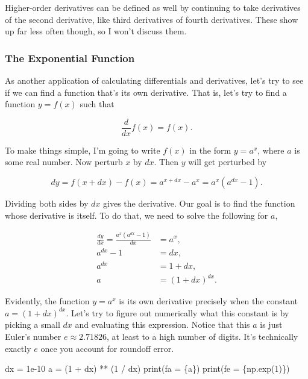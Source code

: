 \documentclass[
  letterpaper,
  DIV=11,
  numbers=noendperiod]{scrreprt}
\newenvironment{Shaded}{\begin{snugshade}}{\end{snugshade}}
\newcommand{\BuiltInTok}[1]{\textcolor[rgb]{0.00,0.23,0.31}{#1}}
\newcommand{\DecValTok}[1]{\textcolor[rgb]{0.68,0.00,0.00}{#1}}
\newcommand{\FloatTok}[1]{\textcolor[rgb]{0.68,0.00,0.00}{#1}}
\newcommand{\NormalTok}[1]{\textcolor[rgb]{0.00,0.23,0.31}{#1}}
\newcommand{\OperatorTok}[1]{\textcolor[rgb]{0.37,0.37,0.37}{#1}}
\newcommand{\SpecialCharTok}[1]{\textcolor[rgb]{0.37,0.37,0.37}{#1}}
\newcommand{\SpecialStringTok}[1]{\textcolor[rgb]{0.13,0.47,0.30}{#1}}
\begin{document}
Higher-order derivatives can be defined as well by continuing to take
derivatives of the second derivative, like third derivatives of fourth
derivatives. These show up far less often though, so I won't discuss
them.

\hypertarget{the-exponential-function}{%
\subsubsection{The Exponential
Function}\label{the-exponential-function}}

As another application of calculating differentials and derivatives,
let's try to see if we can find a function that's its own derivative.
That is, let's try to find a function \(y=f(x)\) such that

\[\frac{d}{dx} f(x) = f(x).\]

To make things simple, I'm going to write \(f(x)\) in the form
\(y=a^x\), where \(a\) is some real number. Now perturb \(x\) by \(dx\).
Then \(y\) will get perturbed by

\[dy = f(x+dx) - f(x) = a^{x+dx} - a^x = a^x(a^{dx} - 1).\]

Dividing both sides by \(dx\) gives the derivative. Our goal is to find
the function whose derivative is itself. To do that, we need to solve
the following for \(a\),

\[
\begin{align*}
\frac{dy}{dx} = \frac{a^x(a^{dx} - 1)}{dx} &= a^x, \\
a^{dx} - 1 &= dx, \\
a^{dx} &= 1 + dx, \\
a &= (1 + dx)^{dx}.
\end{align*}
\]

Evidently, the function \(y=a^x\) is its own derivative precisely when
the constant \(a=(1 + dx)^{dx}\). Let's try to figure out numerically
what this constant is by picking a small \(dx\) and evaluating this
expression. Notice that this \(a\) is just Euler's number
\(e \approx 2.71826\), at least to a high number of digits. It's
technically exactly \(e\) once you account for roundoff error.

\begin{Shaded}
\begin{Highlighting}[]
\NormalTok{dx }\OperatorTok{=} \FloatTok{1e{-}10}
\NormalTok{a }\OperatorTok{=}\NormalTok{ (}\DecValTok{1} \OperatorTok{+}\NormalTok{ dx) }\OperatorTok{**}\NormalTok{ (}\DecValTok{1} \OperatorTok{/}\NormalTok{ dx)}
\BuiltInTok{print}\NormalTok{(}\SpecialStringTok{f\textquotesingle{}a = }\SpecialCharTok{\{}\NormalTok{a}\SpecialCharTok{\}}\SpecialStringTok{\textquotesingle{}}\NormalTok{)}
\BuiltInTok{print}\NormalTok{(}\SpecialStringTok{f\textquotesingle{}e = }\SpecialCharTok{\{}\NormalTok{np}\SpecialCharTok{.}\NormalTok{exp(}\DecValTok{1}\NormalTok{)}\SpecialCharTok{\}}\SpecialStringTok{\textquotesingle{}}\NormalTok{)}
\end{Highlighting}
\end{Shaded}
\end{document}
